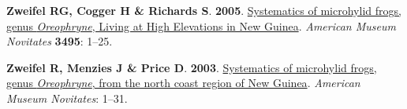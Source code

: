 \documentclass[
  letterpaper,
  DIV=11,
  numbers=noendperiod]{scrartcl}
\newlength{\cslhangindent}
\newenvironment{CSLReferences}[2] %
 {\begin{list}{}{%
  \setlength{\itemindent}{0pt}
  \setlength{\leftmargin}{0pt}
  \setlength{\parsep}{0pt}
  \ifodd #1
   \setlength{\leftmargin}{\cslhangindent}
   \setlength{\itemindent}{-1\cslhangindent}
  \fi
  \setlength{\itemsep}{#2\baselineskip}}}
 {\end{list}}
\begin{document}
\begin{CSLReferences}{0}{1}
\textbf{\textbf{Zweifel RG}, \textbf{Cogger H} \& \textbf{Richards S}}.
\textbf{2005}.
\href{https://doi.org/10.1206/0003-0082(2005)495\%5B0001:SOMFGO\%5D2.0.CO;2}{{Systematics
of microhylid frogs, genus \emph{Oreophryne}, Living at High Elevations
in New Guinea}}. \emph{American Museum Novitates} \textbf{3495}: 1--25.

\textbf{\textbf{Zweifel R}, \textbf{Menzies J} \& \textbf{Price D}}.
\textbf{2003}.
\href{https://doi.org/10.1206/0003-0082(2003)415\%3C0001:SOMFGO\%3E2.0.CO;2}{{Systematics
of microhylid frogs, genus \emph{Oreophryne}, from the north coast
region of New Guinea}}. \emph{American Museum Novitates}: 1--31.

\end{CSLReferences}
\end{document}
